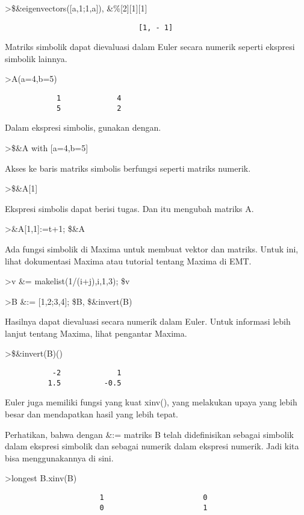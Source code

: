 \documentclass[
]{book}
\begin{document}
\textgreater\$\&eigenvectors({[}a,1;1,a{]}), \&\%{[}2{]}{[}1{]}{[}1{]}

\begin{verbatim}
                               [1, - 1]
\end{verbatim}

Matriks simbolik dapat dievaluasi dalam Euler secara numerik seperti ekspresi simbolik lainnya.

\textgreater A(a=4,b=5)

\begin{verbatim}
            1             4 
            5             2 
\end{verbatim}

Dalam ekspresi simbolis, gunakan dengan.

\textgreater\$\&A with {[}a=4,b=5{]}

Akses ke baris matriks simbolis berfungsi seperti matriks numerik.

\textgreater\$\&A{[}1{]}

Ekspresi simbolis dapat berisi tugas. Dan itu mengubah matriks A.

\textgreater\&A{[}1,1{]}:=t+1; \$\&A

Ada fungsi simbolik di Maxima untuk membuat vektor dan matriks. Untuk ini, lihat dokumentasi Maxima atau tutorial tentang Maxima di EMT.

\textgreater v \&= makelist(1/(i+j),i,1,3); \$v

\textgreater B \&:= {[}1,2;3,4{]}; \$B, \$\&invert(B)

Hasilnya dapat dievaluasi secara numerik dalam Euler. Untuk informasi lebih lanjut tentang Maxima, lihat pengantar Maxima.

\textgreater\$\&invert(B)()

\begin{verbatim}
           -2             1 
          1.5          -0.5 
\end{verbatim}

Euler juga memiliki fungsi yang kuat xinv(), yang melakukan upaya yang lebih besar dan mendapatkan hasil yang lebih tepat.

Perhatikan, bahwa dengan \&:= matriks B telah didefinisikan sebagai simbolik dalam ekspresi simbolik dan sebagai numerik dalam ekspresi numerik. Jadi kita bisa menggunakannya di sini.

\textgreater longest B.xinv(B)

\begin{verbatim}
                      1                       0 
                      0                       1 
\end{verbatim}
\end{document}

